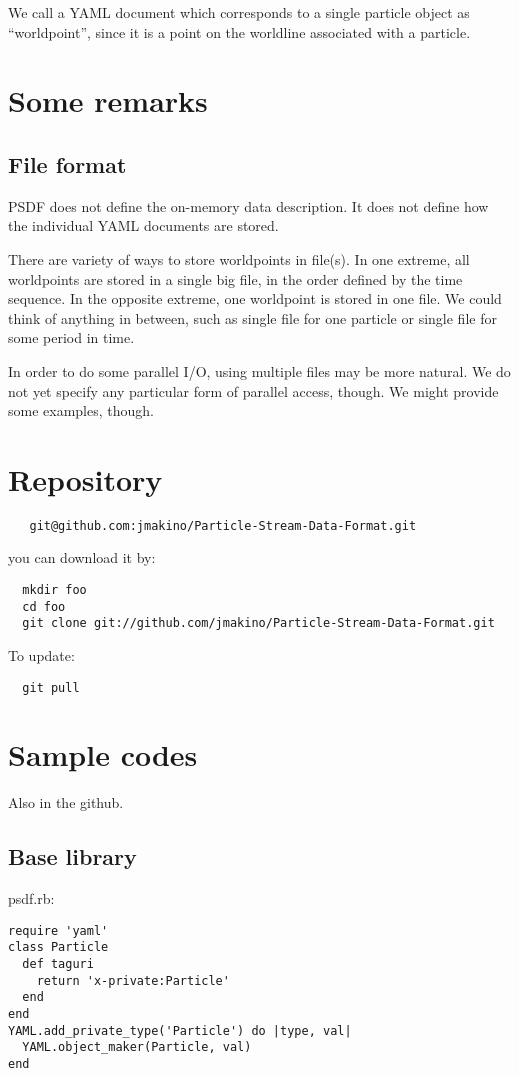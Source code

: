 \documentclass{elsart5p}
\begin{document}
We call a YAML document which corresponds to a single particle object
as ``worldpoint'', since it is a point on the worldline associated
with a particle. 


\section{Some remarks}

\subsection{File format}
PSDF does not define the on-memory data description. It does not
define how the individual YAML documents are stored.

There are variety of ways to store worldpoints in file(s). In one
extreme, all worldpoints are stored in a single big file, in the order
defined by the time sequence. In the opposite extreme, one worldpoint is
stored in one file. We could think of anything in between, such as
single file for one particle or single file for some period in time.

In order to do some parallel I/O, using multiple files may be more
natural. We do not yet specify any particular form of parallel access,
though. We might provide some examples, though.


\section{Repository}


\begin{verbatim}
   git@github.com:jmakino/Particle-Stream-Data-Format.git
\end{verbatim}

you can download it by:
\begin{verbatim}
  mkdir foo
  cd foo
  git clone git://github.com/jmakino/Particle-Stream-Data-Format.git
\end{verbatim}

To update:

\begin{verbatim}
  git pull
\end{verbatim}
  
\section{Sample codes}
Also in the github.

\subsection{Base library}
psdf.rb:
\begin{verbatim}
require 'yaml'
class Particle
  def taguri
    return 'x-private:Particle'
  end
end
YAML.add_private_type('Particle') do |type, val|
  YAML.object_maker(Particle, val)
end
\end{verbatim}
\end{document}
